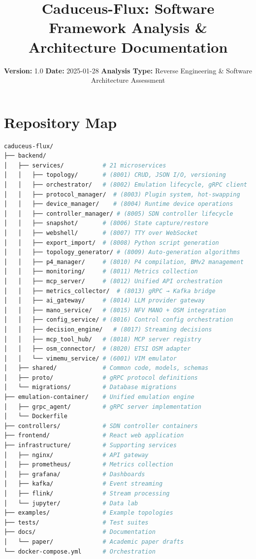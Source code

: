 \documentclass[10pt,a4paper]{article}
\title{\textbf{Caduceus-Flux: Software Framework Analysis \& Architecture Documentation}}
\author{\textbf{Version:} 1.0 \quad \textbf{Date:} 2025-01-28 \quad \textbf{Analysis Type:} Reverse Engineering \& Software Architecture Assessment}
\date{}
\begin{document}
\maketitle
\tableofcontents
\newpage

\section{Repository Map}

\begin{lstlisting}[language=bash, caption=Caduceus-Flux Repository Structure]
caduceus-flux/
├── backend/
│   ├── services/           # 21 microservices
│   │   ├── topology/       # (8001) CRUD, JSON I/O, versioning
│   │   ├── orchestrator/   # (8002) Emulation lifecycle, gRPC client
│   │   ├── protocol_manager/  # (8003) Plugin system, hot-swapping
│   │   ├── device_manager/    # (8004) Runtime device operations
│   │   ├── controller_manager/ # (8005) SDN controller lifecycle
│   │   ├── snapshot/       # (8006) State capture/restore
│   │   ├── webshell/       # (8007) TTY over WebSocket
│   │   ├── export_import/  # (8008) Python script generation
│   │   ├── topology_generator/ # (8009) Auto-generation algorithms
│   │   ├── p4_manager/     # (8010) P4 compilation, BMv2 management
│   │   ├── monitoring/     # (8011) Metrics collection
│   │   ├── mcp_server/     # (8012) Unified API orchestration
│   │   ├── metrics_collector/  # (8013) gRPC → Kafka bridge
│   │   ├── ai_gateway/     # (8014) LLM provider gateway
│   │   ├── mano_service/   # (8015) NFV MANO + OSM integration
│   │   ├── config_service/ # (8016) Control config orchestration
│   │   ├── decision_engine/   # (8017) Streaming decisions
│   │   ├── mcp_tool_hub/   # (8018) MCP server registry
│   │   ├── osm_connector/  # (8020) ETSI OSM adapter
│   │   └── vimemu_service/ # (6001) VIM emulator
│   ├── shared/             # Common code, models, schemas
│   ├── proto/              # gRPC protocol definitions
│   └── migrations/         # Database migrations
├── emulation-container/    # Unified emulation engine
│   ├── grpc_agent/         # gRPC server implementation
│   └── Dockerfile
├── controllers/            # SDN controller containers
├── frontend/               # React web application
├── infrastructure/         # Supporting services
│   ├── nginx/              # API gateway
│   ├── prometheus/         # Metrics collection
│   ├── grafana/            # Dashboards
│   ├── kafka/              # Event streaming
│   ├── flink/              # Stream processing
│   └── jupyter/            # Data lab
├── examples/               # Example topologies
├── tests/                  # Test suites
├── docs/                   # Documentation
│   └── paper/              # Academic paper drafts
└── docker-compose.yml      # Orchestration
\end{lstlisting}
\end{document}
